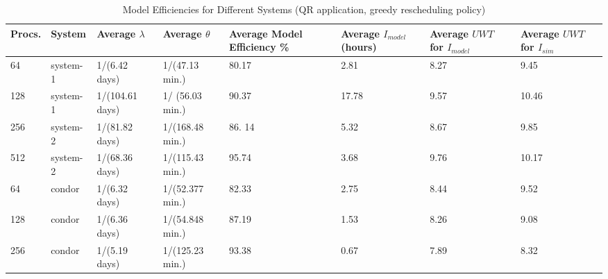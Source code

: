 \documentclass[conference,10pt]{IEEEtran}
\begin{document}
\begin{table*}
\centering
\caption{Model Efficiencies for Different Systems (QR application,
  greedy rescheduling policy)}
\begin{tabular}{|p{0.2in}|p{0.5in}|p{0.8in}|p{0.9in}|p{0.65in}|p{0.45in}|p{0.45in}|p{0.45in}|}
\hline\hline
Procs. & System & Average $\lambda$ & Average $\theta$ & Average Model Efficiency
\% & Average $I_{model}$ (hours) & Average $UWT$ for
$I_{model}$ & Average $UWT$ for $I_{sim}$
\\ \hline\hline
64  &  system-1 & 1/(6.42 days)     & 1/(47.13 min.) & 80.17 & 2.81    & 8.27 & 9.45
\\ \hline
128 & system-1 & 1/(104.61 days) &  1/ (56.03 min.) & 90.37 & 17.78  & 9.57 & 10.46
\\ \hline
256 & system-2 & 1/(81.82 days)   &  1/(168.48 min.) & 86. 14 & 5.32    & 8.67 & 9.85
\\ \hline
512 & system-2 & 1/(68.36 days)   &  1/(115.43 min.) & 95.74 & 3.68    & 9.76 & 10.17
\\ \hline
64 &   condor    & 1/(6.32 days)      & 1/(52.377 min.) & 82.33 & 2.75    & 8.44 & 9.52
\\ \hline
128 & condor    & 1/(6.36 days)      &  1/(54.848 min.) & 87.19 & 1.53   & 8.26 & 9.08
\\ \hline
256 & condor    & 1/(5.19 days)      & 1/(125.23 min.)  & 93.38 & 0.67   & 7.89 & 8.32
\\ \hline\hline
\end{tabular}
\label{different-systems}
\end{table*}
\end{document}
